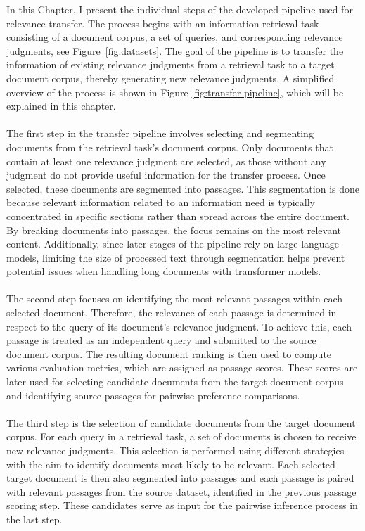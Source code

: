 In this Chapter, I present the individual steps of the developed pipeline used for relevance transfer. The process begins with an information retrieval task consisting of a document corpus, a set of queries, and corresponding relevance judgments, see Figure~\ref{fig:datasets}. The goal of the pipeline is to transfer the information of existing relevance judgments from a retrieval task to a target document corpus, thereby generating new relevance judgments. A simplified overview of the process is shown in Figure \ref{fig:transfer-pipeline}, which will be explained in this chapter.
\\\\
The first step in the transfer pipeline involves selecting and segmenting documents from the retrieval task's document corpus. Only documents that contain at least one relevance judgment are selected, as those without any judgment do not provide useful information for the transfer process. Once selected, these documents are segmented into passages. This segmentation is done because relevant information related to an information need is typically concentrated in specific sections rather than spread across the entire document. By breaking documents into passages, the focus remains on the most relevant content. Additionally, since later stages of the pipeline rely on large language models, limiting the size of processed text through segmentation helps prevent potential issues when handling long documents with transformer models.
\\\\
The second step focuses on identifying the most relevant passages within each selected document. Therefore, the relevance of each passage is determined in respect to the query of its document's relevance judgment. To achieve this, each passage is treated as an independent query and submitted to the source document corpus. The resulting document ranking is then used to compute various evaluation metrics, which are assigned as passage scores. These scores are later used for selecting candidate documents from the target document corpus and identifying source passages for pairwise preference comparisons.
\\\\
The third step is the selection of candidate documents from the target document corpus. For each query in a retrieval task, a set of documents is chosen to receive new relevance judgments. This selection is performed using different strategies with the aim to identify documents most likely to be relevant. Each selected target document is then also segmented into passages and each passage is paired with relevant passages from the source dataset, identified in the previous passage scoring step. These candidates serve as input for the pairwise inference process in the last step.
